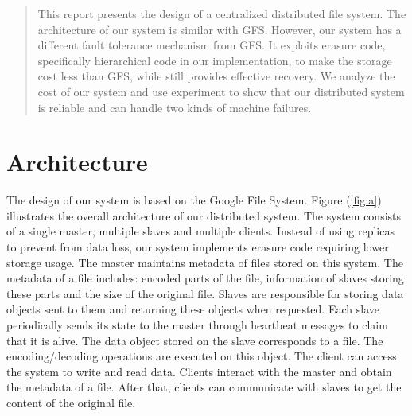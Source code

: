 \documentclass[conference]{IEEEtran}
\begin{document}
\begin{abstract}
\boldmath
This report presents the design of a centralized distributed file system. The architecture of our system is similar with GFS\cite{gfs}. However, our system has a different fault tolerance mechanism from GFS. It exploits erasure code, specifically hierarchical code\cite{hc} in our implementation, to make the storage cost less than GFS, while still provides effective recovery. We analyze the cost of our system and use experiment to show that our distributed system is reliable and can handle two kinds of machine failures.
\end{abstract}





%
\IEEEpeerreviewmaketitle

\section{Architecture}
The design of our system is based on the Google File System\cite{gfs}. Figure (\ref{fig:a}) illustrates the overall architecture of our distributed system.
The system consists of a single master, multiple slaves and  multiple clients. Instead of using replicas to prevent from data loss, our system implements erasure code requiring lower storage usage. The master maintains metadata of files stored on this system. The metadata of a file includes: encoded parts of the file, information of slaves storing these parts and the size of the original file. Slaves are responsible for storing data objects sent to them and returning these objects when requested. Each slave periodically sends its state to the master through heartbeat messages to claim that it is alive. The data object stored on the slave corresponds to a file. The encoding/decoding operations are executed on this object. The client can access the system to write and read data.
Clients interact with the master and obtain the metadata of a file. After that, clients can communicate with slaves to get the content of the original file.
\end{document}
